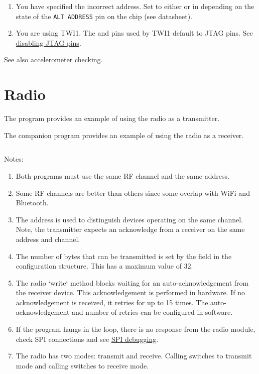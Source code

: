 \begin{enumerate}
\item
  You have specified the incorrect address.  Set
   to either  or  in
   depending on the state of the \verb|ALT ADDRESS| pin
  on the chip (see datasheet).
\item
  You are using TWI1. The  and  pins used by TWI1
  default to JTAG pins. See
  \protect\hyperref[disabling-jtag-pins]{disabling JTAG pins}.
\end{enumerate}
%
See also \protect\hyperref[checking-accelerometer]{accelerometer checking}.


\section{Radio}
\label{radio-test}

The program  provides
an example of using the radio as a transmitter.

The companion program
 provides an example
of using the radio as a receiver.

\inputminted{C}{../../src/test-apps/radio_rx_test1/radio_rx_test1.c}


Notes:
%
\begin{enumerate}
\item Both programs must use the same RF channel and the same address.

\item Some RF channels are better than others since some overlap with
  WiFi and Bluetooth.

\item The address is used to distinguish devices operating on the same
  channel. Note, the transmitter expects an acknowledge from a
  receiver on the same address and channel.

\item The number of bytes that can be transmitted is set by the
   field in the configuration structure.  This has a
  maximum value of 32.

\item The radio `write` method blocks waiting for an
  auto-acknowledgement from the receiver device. This acknowledgement
  is performed in hardware. If no acknowledgement is received, it
  retries for up to 15 times. The auto-acknowledgement and number of
  retries can be configured in software.

\item If the program hangs in the  loop, there is no
  response from the radio module, check SPI connections and see
  \hyperref[debugging-spi]{SPI debugging}.

\item The radio has two modes: transmit and receive.  Calling
   switches to transmit mode and calling
   switches to receive mode.

\end{enumerate}

